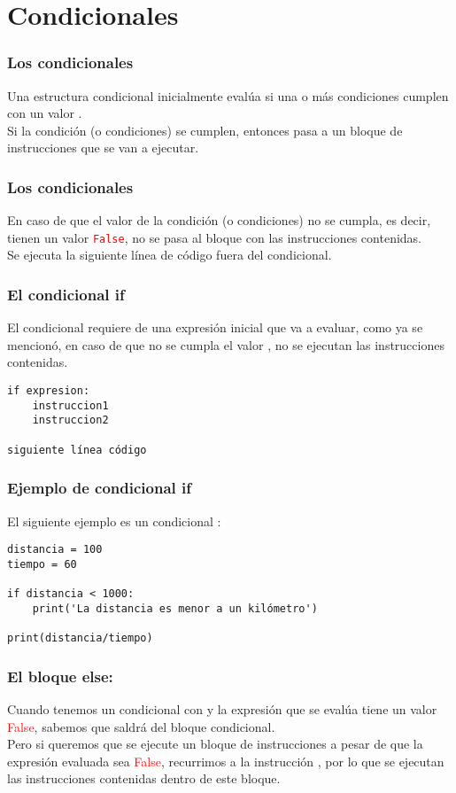 \documentclass[12pt]{beamer}
\begin{document}
\section{Condicionales}

\begin{frame}
\frametitle{Los condicionales}
Una estructura condicional inicialmente evalúa si una o más condiciones cumplen con un valor .
\\
\bigskip
\pause
Si la condición (o condiciones) se cumplen, entonces pasa a un bloque de instrucciones que se van a ejecutar.
\end{frame}
\begin{frame}
\frametitle{Los condicionales}    
En caso de que el valor de la condición (o condiciones) no se cumpla, \pause es decir, tienen un valor \textcolor{red}{\texttt{False}}, \pause no se pasa al bloque con las instrucciones contenidas.
\\
\bigskip
\pause
Se ejecuta la siguiente línea de código fuera del condicional.
\end{frame}
\begin{frame}[fragile]
\frametitle{El condicional if}
El condicional  requiere de una expresión inicial que va a evaluar, como ya se mencionó, en caso de que no se cumpla el valor , no se ejecutan las instrucciones contenidas.
\begin{verbatim}
if expresion:
    instruccion1
    instruccion2

siguiente línea código
\end{verbatim}
\end{frame}
\begin{frame}[fragile]
\frametitle{Ejemplo de condicional if}
El siguiente ejemplo es un condicional :
\pause
\begin{lstlisting}[caption=La estructura condicional if]
distancia = 100
tiempo = 60

if distancia < 1000:
    print('La distancia es menor a un kilómetro')

print(distancia/tiempo)
\end{lstlisting}
\end{frame}
\begin{frame}
\frametitle{El bloque else:}
Cuando tenemos un condicional con  y la expresión que se evalúa tiene un valor \textcolor{red}{False}, sabemos que saldrá del bloque condicional.
\\
\bigskip
\pause
Pero si queremos que se ejecute un bloque de instrucciones a pesar de que la expresión evaluada sea \textcolor{red}{False}, \pause recurrimos a la instrucción , por lo que se ejecutan las instrucciones contenidas dentro de este bloque.
\end{frame}
\end{document}
